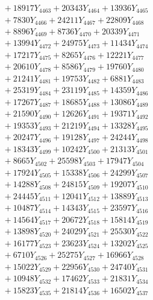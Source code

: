 \documentclass[a4paper,10pt]{article}
\begin{document}
{\begin{align}
&\;  + 18917 Y_{4463} + 20343 Y_{4464} + 13936 Y_{4465} \\[0.3ex]
&\;  + 7830 Y_{4466} + 24211 Y_{4467} + 22809 Y_{4468} \\[0.5ex]\allowbreak
&\;  + 8896 Y_{4469} + 8736 Y_{4470} + 20339 Y_{4471} \\[0.3ex]
&\;  + 13994 Y_{4472} + 24975 Y_{4473} + 11434 Y_{4474} \\[0.3ex]
&\;  + 17217 Y_{4475} + 8265 Y_{4476} + 12221 Y_{4477} \\[0.3ex]
&\;  + 20610 Y_{4478} + 8586 Y_{4479} + 19760 Y_{4480} \\[0.3ex]
&\;  + 21241 Y_{4481} + 19753 Y_{4482} + 6881 Y_{4483} \\[0.3ex]
&\;  + 25319 Y_{4484} + 23119 Y_{4485} + 14359 Y_{4486} \\[0.3ex]
&\;  + 17267 Y_{4487} + 18685 Y_{4488} + 13086 Y_{4489} \\[0.3ex]
&\;  + 21590 Y_{4490} + 12626 Y_{4491} + 19371 Y_{4492} \\[0.3ex]
&\;  + 19353 Y_{4493} + 21219 Y_{4494} + 13328 Y_{4495} \\[0.3ex]
&\;  + 20247 Y_{4496} + 19128 Y_{4497} + 24244 Y_{4498} \\[0.5ex]\allowbreak
&\;  + 18343 Y_{4499} + 10242 Y_{4500} + 21313 Y_{4501} \\[0.3ex]
&\;  + 8665 Y_{4502} + 25598 Y_{4503} + 17947 Y_{4504} \\[0.3ex]
&\;  + 17924 Y_{4505} + 15338 Y_{4506} + 24299 Y_{4507} \\[0.3ex]
&\;  + 14288 Y_{4508} + 24815 Y_{4509} + 19207 Y_{4510} \\[0.3ex]
&\;  + 24445 Y_{4511} + 12041 Y_{4512} + 13889 Y_{4513} \\[0.3ex]
&\;  + 10487 Y_{4514} + 14343 Y_{4515} + 23597 Y_{4516} \\[0.3ex]
&\;  + 14564 Y_{4517} + 20672 Y_{4518} + 15814 Y_{4519} \\[0.3ex]
&\;  + 13898 Y_{4520} + 24029 Y_{4521} + 25530 Y_{4522} \\[0.3ex]
&\;  + 16177 Y_{4523} + 23623 Y_{4524} + 13202 Y_{4525} \\[0.3ex]
&\;  + 6710 Y_{4526} + 25275 Y_{4527} + 16966 Y_{4528} \\[0.5ex]\allowbreak
&\;  + 15022 Y_{4529} + 22956 Y_{4530} + 24740 Y_{4531} \\[0.3ex]
&\;  + 10948 Y_{4532} + 17462 Y_{4533} + 21831 Y_{4534} \\[0.3ex]
&\;  + 15823 Y_{4535} + 21814 Y_{4536} + 16502 Y_{4537} \\[0.3ex]

\end{align}}
\end{document}
